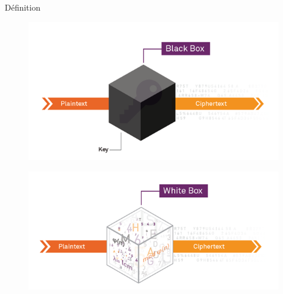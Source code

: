 \documentclass{beamer}
\begin{document}
\begin{frame}{Définition}

  \begin{figure}[h]
    \centering
    \includegraphics[scale=0.30]{./images/blackbox.png}
  \end{figure}

  \begin{figure}[h]
    \centering
    \includegraphics[scale=0.30]{./images/whitebox.png}
  \end{figure}

\end{frame}
\end{document}
